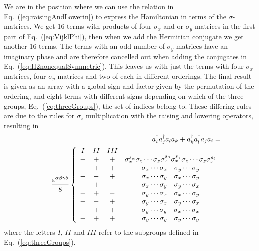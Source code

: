 \documentclass[aps,pra,twocolumn,floatfix]{revtex4}
\begin{document}
We are in the position where we can use the relation in 
Eq.~(\ref{eq:raisingAndLowerin}) to express
the Hamiltonian in terms of the $\sigma$-matrices.  
We get 16 terms with products of four
$\sigma_x$ and or $\sigma_y$ matrices in the first part of
Eq.~(\ref{eq:VijklPhi}),
then when we add the Hermitian conjugate we get another 16 terms.
The terms with an odd number of $\sigma_y$ matrices have an imaginary
phase and are therefore cancelled out
when adding the conjugates in Eq.~(\ref{eq:H2nonequalSymmetric}).
This leaves us with just the terms with four $\sigma_x$
matrices, four $\sigma_y$ matrices and two of each in different
orderings. 
The final result is given as an array with a global sign and factor
given by the permutation of the ordering, and eight terms with
different signs depending on which of the three groups,
Eq.~(\ref{eq:threeGroups}), the set of indices belong to.
These differing rules are due to the rules for $\sigma_z$
multiplication with the raising and lowering operators,  resulting  in 
\begin{eqnarray}
\label{eq:Phiijkl}
&&a^\dag_i a^\dag_j a_l a_k + a_k^\dag a_l^\dag a_j a_i= \notag \\
&&-\frac{\varepsilon^{\alpha\beta\gamma\delta}}{8} \left\{
\begin{array}{cccc}
I & II & III &  \\
+& + & + & \sigma_x^{s_\alpha} \sigma_z \cdots \sigma_z 
\sigma_x^{s_\beta} \sigma_x^{s_\gamma}\sigma_z\cdots \sigma_z
\sigma_x^{s_\delta}\\
-& +& +& \sigma_x \cdots \sigma_x \quad \sigma_y \cdots\sigma_y \\
+& -& +& \sigma_x \cdots \sigma_y \quad \sigma_x \cdots\sigma_y \\
+& +& -& \sigma_x \cdots \sigma_y \quad \sigma_y \cdots\sigma_x \\
+& +& -& \sigma_y \cdots \sigma_x \quad \sigma_x \cdots\sigma_y \\
+& -& +& \sigma_y \cdots \sigma_x \quad \sigma_y \cdots\sigma_x \\
-& +& +& \sigma_y \cdots \sigma_y \quad \sigma_x \cdots\sigma_x \\
+& +& +& \sigma_y \cdots \sigma_y \quad \sigma_y \cdots\sigma_y \\
\end{array} 
\right.
\end{eqnarray}
where the letters $I$, $II$ and $III$ refer to the subgroups defined
in Eq.~(\ref{eq:threeGroups}). 
\end{document}

